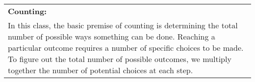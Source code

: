 {\tabulinesep=1mm
\begin{tabu}{|p{16cm} |}
 \hline
\textbf{Counting:} \\
In this class, the basic premise of counting is determining the total number of possible ways something can be done. Reaching a particular outcome requires a number of specific choices to be made. To figure out the total number of possible outcomes, we multiply together the number of potential choices at each step. 
\\
\hline
 \end{tabu}
}